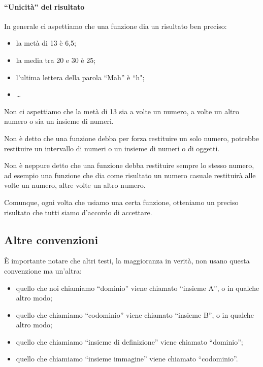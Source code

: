 \begin{osservazione}
\paragraph{``Unicità'' del risultato}

In generale ci aspettiamo che una funzione dia un risultato ben preciso:
\begin{itemize} [nosep]
 \item la metà di 13 è 6,5;
 \item la media tra 20 e 30 è 25;
 \item l'ultima lettera della parola  ``Mah'' è  ``h";
 \item \dots
\end{itemize}

Non ci aspettiamo che la metà di 13 sia a volte un numero, a volte un altro 
numero o sia un insieme di numeri.

Non è detto che una funzione debba per forza restituire un solo numero, 
potrebbe restituire un intervallo di numeri o un insieme di numeri o di 
oggetti.

Non è neppure detto che una funzione debba restituire sempre lo stesso 
numero, ad esempio una funzione che dia come risultato un numero casuale 
restituirà alle volte un numero, altre volte un altro numero.

Comunque, ogni volta che usiamo una certa funzione, otteniamo un preciso 
risultato che tutti siamo d'accordo di accettare.
\end{osservazione}

\subsection{Altre convenzioni}

È importante notare che altri testi, la maggioranza in verità, non usano 
questa convenzione ma un'altra:

\begin{itemize} [nosep]
 \item quello che noi chiamiamo ``dominio'' viene chiamato  ``insieme A'', 
o in 
qualche altro modo;
 \item quello che chiamiamo ``codominio'' viene chiamato  ``insieme B'', o 
in qualche altro modo;
 \item quello che chiamiamo ``insieme di definizione'' viene chiamato 
``dominio'';
 \item quello che chiamiamo ``insieme immagine'' viene chiamato 
``codominio''.
\end{itemize}

